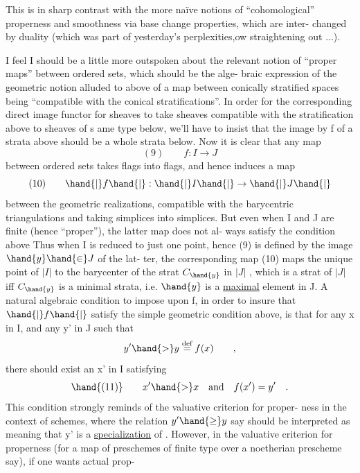 
This is in sharp contrast with the more naïve notions of ``cohomological''
properness and smoothness via base change properties, which are inter-%
changed by duality (which was part of yesterday's perplexities,ow
straightening out ...).

I feel I should be a little more outspoken about the relevant
notion of ``proper maps'' between ordered sets, which should be the alge-%
braic expression of the geometric notion alluded to above\hand{,} of a map
between conically stratified spaces being ``compatible with the conical
stratifications''. In order for the corresponding direct image functor
for sheaves to take sheaves compatible with the stratification above to
sheaves of s ame type below, we'll have to insist that the image by f
of a strata above should be a whole strata below. Now it is clear that
any map
\[ (9) \qquad f: I \longrightarrow J \]
between ordered sets  takes flags into flags, and hence induces
a map
\[ (10) \qquad \hand{|}f\hand{|}:\hand{|}I\hand{|}\to\hand{|}J\hand{|} \]
between the geometric realizations, compatible with the barycentric
triangulations and  taking simplices into simplices. But even
when I and J are finite (hence ``proper''), the latter map does not al-%
ways satisfy the condition above  Thus when I is reduced to
just one point, hence (9) is defined  by the image $\hand{y}\hand{\in} J$ of the lat-%
ter, the corresponding map (10) maps the unique point of $|I|$ to the
barycenter of the strat $C_{\hand{y}}$ in $|J|$ , which is a strat of $|J|$ iff
 $C_{\hand{y}}$ is a minimal strata, i.e. $\hand{y}$ is a \uline{maximal} element in J.
A natural algebraic condition to impose upon f, in order to insure
that $\hand{|}f\hand{|}$ satisfy the simple geometric condition above, is that for
any x in I, and any y' in J such that
\[ y' \hand{>} y \overset{\text{def}}{=} f(x) \qquad , \]
there should exist an x' in I satisfying
\[ \hand{(11)} \qquad x' \hand{>} x \quad \text{and} \quad f(x') = y' \quad . \]
This condition strongly reminds of the valuative criterion for proper-%
ness in the context of schemes, where the relation $y' \hand{\geq} y$ \hand{,} say\hand{,} should
be interpreted as meaning that y' is a \uline{specialization} of  . However,
in the valuative criterion for properness (for a map of preschemes of
finite type over a noetherian prescheme say), if one wants actual prop-%

